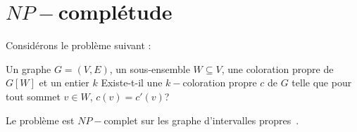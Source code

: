 \documentclass[a4paper,11pt]{thesis}
\begin{document}
\section{$NP-$complétude}

Considérons le problème suivant :

\dfdec{\precolor}
{Un graphe $G=(V, E)$, un sous-ensemble $W \subseteq V$, une coloration propre de $G[W]$ et un
entier $k$}
{Existe-t-il une $k-$coloration propre $c$ de $G$ telle que pour tout sommet $v \in W$, $c(v) =
c'(v)$?}

\begin{nthrm}
    Le problème \precolor est $NP-$complet sur les graphe d'intervalles
    propres~\cite{marx2006precoloring}.
\end{nthrm}



\appendix


\end{document}
